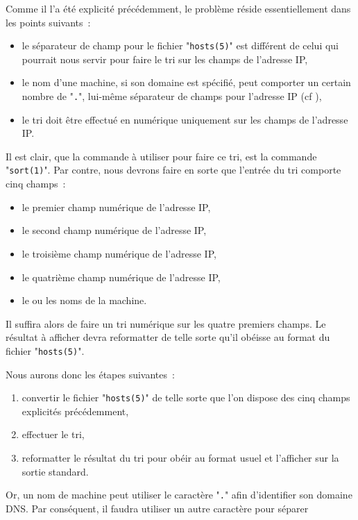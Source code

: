 Comme il l'a {\'e}t{\'e} explicit{\'e} pr{\'e}c{\'e}demment, le probl{\`e}me r{\'e}side essentiellement
dans les points suivants~:
\begin{itemize}
	\item	le s{\'e}parateur de champ pour le fichier "{\tt hosts(5)}" est
			diff{\'e}rent de celui qui pourrait nous servir pour faire le tri
			sur les champs de l'adresse IP,
	\item	le nom d'une machine, si son domaine est sp{\'e}cifi{\'e}, peut comporter
			un certain nombre de "{\tt .}", lui-m{\^e}me s{\'e}parateur de champs
			pour l'adresse IP (cf \cite{dns-bind}),
	\item	le tri doit {\^e}tre effectu{\'e} en num{\'e}rique uniquement sur les champs
			de l'adresse IP.
\end{itemize}

Il est clair, que la commande {\`a} utiliser pour faire ce tri, est la commande
"{\tt sort(1)}". Par contre, nous devrons faire en sorte que l'entr{\'e}e
du tri comporte cinq champs~:
\begin{itemize}
	\item	le premier champ num{\'e}rique de l'adresse IP,
	\item	le second champ num{\'e}rique de l'adresse IP,
	\item	le troisi{\`e}me champ num{\'e}rique de l'adresse IP,
	\item	le quatri{\`e}me champ num{\'e}rique de l'adresse IP,
	\item	le ou les noms de la machine.
\end{itemize}
Il suffira alors de faire un tri num{\'e}rique sur les quatre premiers champs.
Le r{\'e}sultat {\`a} afficher devra reformatter de telle sorte qu'il ob{\'e}isse
au format du fichier "{\tt hosts(5)}".

Nous aurons donc les {\'e}tapes suivantes~:
\begin{enumerate}
	\item	convertir le fichier "{\tt hosts(5)}" de telle sorte que l'on
			dispose des cinq champs explicit{\'e}s pr{\'e}c{\'e}demment,
	\item	effectuer le tri,
	\item	reformatter le r{\'e}sultat du tri pour ob{\'e}ir au format usuel et
			l'afficher sur la sortie standard.
\end{enumerate}

Or, un nom de machine peut utiliser le caract{\`e}re "{\tt .}" afin d'identifier
son domaine DNS. Par cons{\'e}quent, il faudra utiliser un autre caract{\`e}re pour
s{\'e}parer

